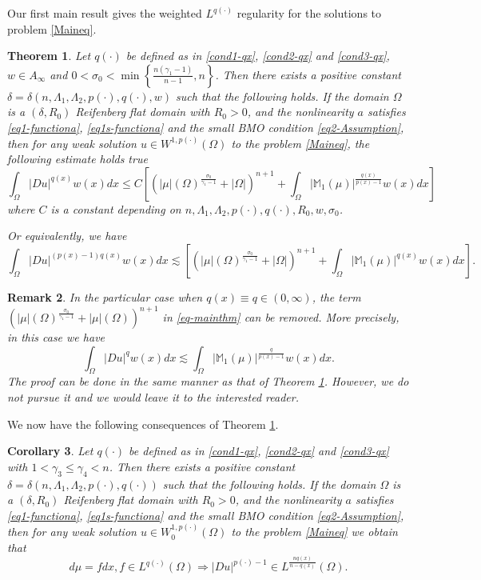 \documentclass[a4paper,10pt]{amsart}
\newtheorem{thm}{Theorem}[section]
\newtheorem{cor}[thm]{Corollary}
\newtheorem{rem}[thm]{Remark}
\newcommand{\Mu}{\mathbb{M}_1(\mu)}
\newcommand{\lesi}{\lesssim}
\newcommand{\pd}{p(\cdot)}
\newcommand{\f}{\frac}
\newcommand{\Om}{\Omega}
\newcommand{\vc}{\infty}
\begin{document}
Our first main result gives the weighted $L^{q(\cdot)}$ regularity for the solutions to problem \eqref{Maineq}.
\begin{thm}\label{mainthm1}
	Let $q(\cdot)$ be defined as in \eqref{cond1-qx}, \eqref{cond2-qx} and \eqref{cond3-qx}, $w\in A_{\vc}$ and $0<\sigma_0<\min\left\{\f{n(\gamma_1-1)}{n-1},n\right\}$. Then there
	exists  a positive constant $\delta=\delta(n,\Lambda_1, \Lambda_2, \pd,q(\cdot), w)$ such that the following holds. If the domain $\Omega$ is a $(\delta, R_0)$ Reifenberg flat domain with $ R_0>0$, and the nonlinearity $a$  satisfies \eqref{eq1-functiona}, \eqref{eq1s-functiona} and the small BMO condition \eqref{eq2-Assumption}, then for any weak solution $u\in W^{1,\pd}(\Om)$ to the problem \eqref{Maineq}, the following estimate holds true
	\begin{equation}\label{eq-mainthm}
	\int_{\Om} |Du|^{q(x)}w(x)dx \leq C\left[(|\mu|(\Om)^{\f{\sigma_0}{\gamma_1-1}}+|\Om|)^{n+1} + \int_{\Om} |\Mu|^{\f{q(x)}{p(x)-1}}w(x)dx\right]
	\end{equation}
	where $C$ is a constant depending on $n,\Lambda_1, \Lambda_2, \pd, q(\cdot), R_0,w, \sigma_0$.
	
	Or equivalently, we have
	\begin{equation}\label{eqs-mainthm}
	\int_{\Om} |Du|^{(p(x)-1)q(x)}w(x)dx \lesi \left[(|\mu|(\Om)^{\f{\sigma_0}{\gamma_1-1}}+|\Om|)^{n+1} + \int_{\Om} |\Mu|^{q(x)}w(x)dx\right].
	\end{equation}
	
\end{thm}
\begin{rem}
	In the particular case when $q(x)\equiv q\in (0,\vc)$, the term $(|\mu|(\Om)^{\f{\sigma_0}{\gamma_1-1}}+|\mu|(\Om))^{n+1}$ in \eqref{eq-mainthm} can be removed. More precisely, in this case we have
	$$
	\int_{\Om} |Du|^{q}w(x)dx \lesi \int_{\Om} |\Mu|^{\f{q}{p(x)-1}}w(x)dx.
	$$
	The proof can be done in the same manner as that of Theorem \ref{mainthm1}. However, we do not pursue it and we would leave it to the interested reader.
\end{rem} 
We now have the following consequences of Theorem \ref{mainthm1}.

\begin{cor}\label{mainthm2}
	Let $q(\cdot)$ be defined as in \eqref{cond1-qx}, \eqref{cond2-qx} and  \eqref{cond3-qx} with $1<\gamma_3\leq \gamma_4<n$. Then there
	exists  a positive constant $\delta=\delta(n,\Lambda_1, \Lambda_2, \pd,q(\cdot))$ such that the following holds. If the domain $\Omega$ is a $(\delta, R_0)$ Reifenberg flat domain with $ R_0>0$, and the nonlinearity  $a$ satisfies \eqref{eq1-functiona}, \eqref{eq1s-functiona} and the small BMO condition \eqref{eq2-Assumption}, then for any weak solution $u\in W^{1,\pd}_0(\Om)$ to the problem \eqref{Maineq} we obtain that
	\begin{equation}\label{eq2-mainthm}
	d\mu=fdx, f\in L^{q(\cdot)}(\Om)\Rightarrow |Du|^{\pd-1}\in L^{\f{nq(x)}{n-q(x)}}(\Om).
	\end{equation}
	
\end{cor}
\end{document}
